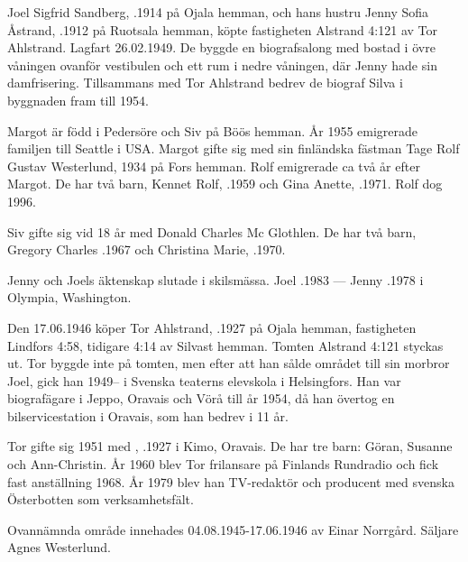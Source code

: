 Joel Sigfrid Sandberg, .1914 på Ojala hemman, och hans hustru Jenny Sofia Åstrand, .1912 på	Ruotsala hemman, köpte fastigheten Alstrand 4:121 av Tor Ahlstrand. Lagfart 26.02.1949. De byggde en biografsalong med bostad i övre våningen ovanför vestibulen och ett rum	i nedre våningen, där Jenny hade sin damfrisering. Tillsammans med Tor Ahlstrand bedrev de biograf Silva i byggnaden fram till 1954.
\begin{jhchildren}
  \item {}
  \item {}
\end{jhchildren}
Margot är född i Pedersöre och Siv på Böös hemman. År 1955 emigrerade familjen till Seattle i USA. Margot gifte sig	med sin finländska fästman Tage Rolf Gustav Westerlund,  1934 på Fors hemman. Rolf emigrerade ca två år efter Margot. De har två barn, Kennet Rolf, .1959 och Gina Anette, .1971. Rolf dog 1996.

Siv gifte sig vid 18 år med Donald Charles Mc Glothlen. De har två barn, Gregory Charles .1967 och Christina Marie, .1970.

Jenny och Joels äktenskap slutade i skilsmässa.	Joel .1983  ---  Jenny .1978 i Olympia, Washington.


Den 17.06.1946 köper Tor Ahlstrand, .1927 på Ojala hemman, fastigheten Lindfors 4:58, tidigare 4:14 av Silvast hemman. Tomten Alstrand 4:121 styckas ut.	Tor byggde inte på tomten, men efter att han sålde området till sin morbror Joel, gick han 1949-- i Svenska teaterns elevskola i Helsingfors. Han var biografägare i Jeppo, Oravais och Vörå till år 1954, då han övertog en bilservicestation i Oravais, som han bedrev i 11 år.

Tor gifte sig 1951 med , .1927 i Kimo, Oravais. De har tre barn: Göran, Susanne och Ann-Christin.	År 1960 blev Tor frilansare på Finlands Rundradio och fick fast anställning 1968. År 1979 blev han TV-redaktör och producent med svenska Österbotten som verksamhetsfält.


Ovannämnda område innehades 04.08.1945-17.06.1946	av Einar Norrgård. Säljare Agnes Westerlund.\jhvspace{}


